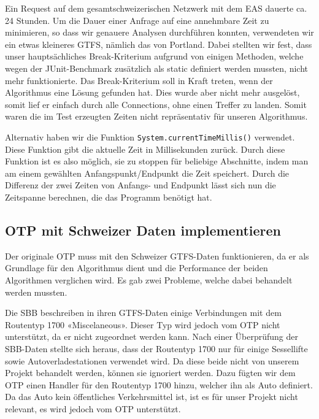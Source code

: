 Ein Request auf dem gesamtschweizerischen Netzwerk mit dem EAS dauerte ca. 24 Stunden. Um die Dauer einer Anfrage auf eine annehmbare Zeit zu minimieren, so dass wir genauere Analysen durchführen konnten, verwendeten wir ein etwas kleineres GTFS, nämlich das von Portland. Dabei stellten wir fest, dass unser hauptsächliches Break-Kriterium aufgrund von einigen Methoden, welche wegen der JUnit-Benchmark zusätzlich als static definiert werden mussten, nicht mehr funktionierte. Das Break-Kriterium soll in Kraft treten, wenn der Algorithmus eine Lösung gefunden hat. Dies wurde aber nicht mehr ausgelöst, somit lief er einfach durch alle Connections, ohne einen Treffer zu landen. Somit waren die im Test erzeugten Zeiten nicht repräsentativ für unseren Algorithmus. \newline

Alternativ haben wir die Funktion \texttt{System.currentTimeMillis()} verwendet. Diese Funktion gibt die aktuelle Zeit in Millisekunden zurück. Durch diese Funktion ist es also möglich, sie zu stoppen für beliebige Abschnitte, indem man am einem gewählten Anfangspunkt/Endpunkt die Zeit speichert. Durch die Differenz der zwei Zeiten von Anfangs- und Endpunkt lässt sich nun die Zeitspanne berechnen, die das Programm benötigt hat. 

\subsection{OTP mit Schweizer Daten implementieren}
Der originale OTP muss mit den Schweizer GTFS-Daten funktionieren, da er als Grundlage für den Algorithmus dient und die Performance der beiden Algorithmen verglichen wird. Es gab zwei Probleme, welche dabei behandelt werden mussten.
\newline

Die SBB beschreiben in ihren GTFS-Daten einige Verbindungen mit dem Routentyp 1700 «Miscelaneous». Dieser Typ wird jedoch vom OTP nicht unterstützt, da er nicht zugeordnet werden kann. Nach einer Überprüfung der SBB-Daten stellte sich heraus, dass der Routentyp 1700 nur für einige Sessellifte sowie Autoverladestationen verwendet wird. Da diese beide nicht von unserem Projekt behandelt werden, können sie ignoriert werden. Dazu fügten wir dem OTP einen Handler für den Routentyp 1700 hinzu, welcher ihn als Auto definiert. Da das Auto kein öffentliches Verkehrsmittel ist, ist es für unser Projekt nicht relevant, es wird jedoch vom OTP unterstützt.
\newline


